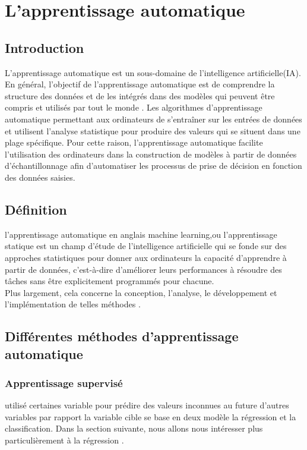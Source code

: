 \documentclass[12pt]{report}
\begin{document}
\newpage
\section{L'apprentissage automatique}

\subsection{Introduction}

L'apprentissage automatique est un sous-domaine de l'intelligence artificielle(IA). En général, l'objectif de l'apprentissage automatique est de comprendre la structure des données et de les intégrés dans des modèles qui peuvent être compris et utilisés par tout le monde \cite{ref10}.
 Les algorithmes d'apprentissage automatique permettant aux ordinateurs de s'entraîner sur les entrées de données et utilisent l'analyse statistique pour produire des valeurs qui se situent dans une plage spécifique. Pour cette raison, l'apprentissage automatique facilite l'utilisation des ordinateurs dans la construction de modèles à partir de données d'échantillonnage afin d'automatiser les processus de prise de décision en fonction des données saisies.

\subsection{Définition}
l'apprentissage automatique en anglais machine learning,ou l'apprentissage statique est un champ d'étude de l'intelligence artificielle qui se fonde sur des approches statistiques pour donner aux ordinateurs la capacité d'apprendre à partir de données, c'est-à-dire d'améliorer leurs performances à résoudre des tâches sans être explicitement programmés pour chacune.\\ Plus largement, cela concerne la conception, l'analyse, le développement et l'implémentation de telles méthodes \cite{ref11} .

\subsection{Différentes méthodes d'apprentissage automatique}
  \subsubsection{Apprentissage supervisé}
utilisé certaines variable pour prédire des valeurs inconnues au future d'autres variables par rapport la variable cible se base en deux modèle la régression et la classification. Dans la section suivante, nous allons nous intéresser plus particulièrement à la régression \cite{ref11} .
\end{document}
